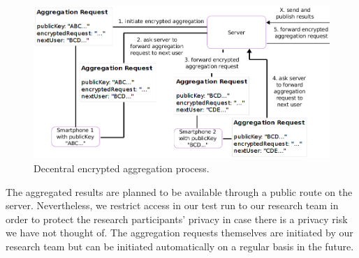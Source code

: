  \begin{figure}[h!]
	\includegraphics[width=\textwidth]{data/diagrams/decentral-encrypted-aggregation.png}
	\caption{Decentral encrypted aggregation process.}
	\label{decentral-aggregation-encrypted}
\end{figure}

 The aggregated results are planned to be available through a public route on the server. Nevertheless, we restrict access in our test run to our research team in order to protect the research participants' privacy in case there is a privacy risk we have not thought of. The aggregation requests themselves are initiated by our research team but can be initiated automatically on a regular basis in the future.

